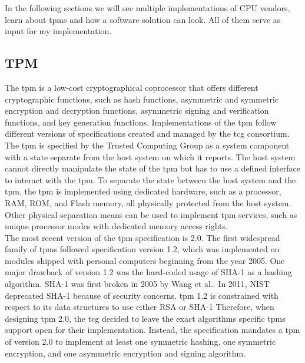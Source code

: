 In the following sections we will see multiple implementations of CPU vendors,
learn about \glspl{tpm} and how a software solution can look. All of them serve
as input for my implementation.

\subsection{TPM}
\label{sec:20:tpm}
The \gls{tpm} is a low-cost cryptographical coprocessor that offers different
cryptographic functions, such as hash functions, asymmetric and symmetric
encryption and decryption functions, asymmetric signing and verification
functions, and key generation functions. Implementations of the \gls{tpm} follow
different versions of specifications created and managed by the \gls{tcg}
consortium.\cite{tpm_architecture} The \gls{tpm} is specified by the Trusted
Computing Group as a system component with a state separate from the host system
on which it reports. The host system cannot directly manipulate the state of the
\gls{tpm} but has to use a defined interface to interact with the \gls{tpm}. To
separate the state between the host system and the \gls{tpm}, the \gls{tpm} is
implemented using dedicated hardware, such as a processor, RAM, ROM, and Flash
memory, all physically protected from the host system. Other physical separation
means can be used to implement \gls{tpm} services, such as unique processor
modes with dedicated memory access rights.\\

The most recent version of the \gls{tpm} specification is 2.0. The first
widespread family of \glspl{tpm} followed specification version 1.2, which was
implemented on modules shipped with personal computers beginning from the year
2005.\cite{arthur2015practical} One major drawback of version 1.2 was the
hard-coded usage of SHA-1 as a hashing algorithm. SHA-1 was first broken in 2005
by Wang et al.\cite{wang2005collision}. In 2011, NIST deprecated SHA-1 because
of security concerns.\cite{nist-sha1} \gls{tpm} 1.2 is constrained with respect
to its data structures to use either RSA or SHA-1\cite{tpm_architecture}
Therefore, when designing \gls{tpm} 2.0, the \gls{tcg} decided to leave the
exact algorithms specific \glspl{tpm} support open for their implementation.
Instead, the specification mandates a \gls{tpm} of version 2.0 to implement at
least one symmetric hashing, one symmetric encryption, and one asymmetric
encryption and signing algorithm. \\


